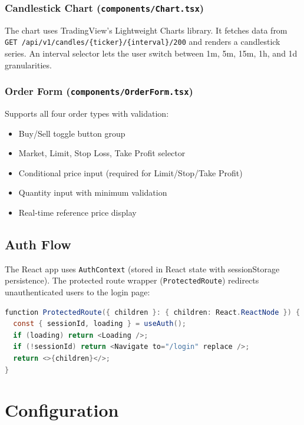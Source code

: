 \documentclass[12pt,a4paper]{report}
\begin{document}
\subsection{Candlestick Chart (\texttt{components/Chart.tsx})}

The chart uses TradingView's Lightweight Charts library. It fetches data
from \texttt{GET /api/v1/candles/\{ticker\}/\{interval\}/200} and renders a
candlestick series. An interval selector lets the user switch between
1m, 5m, 15m, 1h, and 1d granularities.

\subsection{Order Form (\texttt{components/OrderForm.tsx})}

Supports all four order types with validation:
\begin{itemize}
\item Buy/Sell toggle button group
\item Market, Limit, Stop Loss, Take Profit selector
\item Conditional price input (required for Limit/Stop/Take Profit)
\item Quantity input with minimum validation
\item Real-time reference price display
\end{itemize}

\section{Auth Flow}

The React app uses \texttt{AuthContext} (stored in React state with
sessionStorage persistence). The protected route wrapper
(\texttt{ProtectedRoute}) redirects unauthenticated users to the login page:

\begin{lstlisting}[language=Java, caption=Protected route logic]
function ProtectedRoute({ children }: { children: React.ReactNode }) {
  const { sessionId, loading } = useAuth();
  if (loading) return <Loading />;
  if (!sessionId) return <Navigate to="/login" replace />;
  return <>{children}</>;
}
\end{lstlisting}

\chapter{Configuration}
\end{document}
